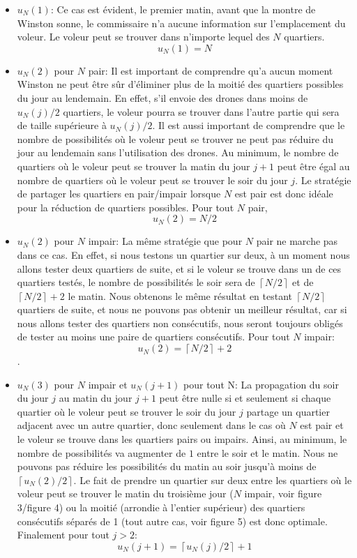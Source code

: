 \begin{itemize}
    \item {$u_N(1)$}: Ce cas est évident, le premier matin, avant que la montre de Winston sonne, le commissaire n'a aucune information sur l'emplacement du voleur. Le voleur peut se trouver dans n'importe lequel des $N$ quartiers.
    $$u_N(1)=N$$
    \item {$u_N(2)$ pour $N$ pair}: Il est important de comprendre qu'a aucun moment Winston ne peut être sûr d'éliminer plus de la moitié des quartiers possibles du jour au lendemain. En effet, s'il envoie des drones dans moins de $u_N(j)/2$ quartiers, le voleur pourra se trouver dans l'autre partie qui sera de taille supérieure à $u_N(j)/2$. Il est aussi important de comprendre que le nombre de possibilités où le voleur peut se trouver ne peut pas réduire du jour au lendemain sans l'utilisation des drones. Au minimum, le nombre de quartiers où le voleur peut se trouver la matin du jour $j+1$ peut être égal au nombre de quartiers où le voleur peut se trouver le soir du jour $j$. Le stratégie de partager les quartiers en pair/impair lorsque $N$ est pair est donc idéale pour la réduction de quartiers possibles. Pour tout $N$ pair, $$u_N(2)=N/2$$
    \item {$u_N(2)$ pour $N$ impair}: La même stratégie que pour $N$ pair ne marche pas dans ce cas. En effet, si nous testons un quartier sur deux, à un moment nous allons tester deux quartiers de suite, et si le voleur se trouve dans un de ces quartiers testés, le nombre de possibilités le soir sera de $\left\lceil N/2\right\rceil$ et de $\left\lceil N/2\right\rceil+2$ le matin. Nous obtenons le même résultat en testant $\left\lceil N/2\right\rceil$ quartiers de suite, et nous ne pouvons pas obtenir un meilleur résultat, car si nous allons tester des quartiers non consécutifs, nous seront toujours obligés de tester au moins une paire de quartiers consécutifs. Pour tout $N$ impair: $$u_N(2)=\left\lceil N/2\right\rceil+2$$.
    \item {$u_N(3)$ pour $N$ impair et $u_N(j+1)$ pour tout N}: La propagation du soir du jour $j$ au matin du jour $j+1$ peut être nulle si et seulement si chaque quartier où le voleur peut se trouver le soir du jour $j$ partage un quartier adjacent avec un autre quartier, donc seulement dans le cas où $N$ est pair et le voleur se trouve dans les quartiers pairs ou impairs. Ainsi, au minimum, le nombre de possibilités va augmenter de $1$ entre le soir et le matin. Nous ne pouvons pas réduire les possibilités du matin au soir jusqu'à moins de $\left\lceil u_N(2)/2 \right\rceil$. Le fait de prendre un quartier sur deux entre les quartiers où le voleur peut se trouver le matin du troisième jour ($N$ impair, voir figure 3/figure 4) ou la moitié (arrondie à l'entier supérieur) des quartiers consécutifs séparés de 1 (tout autre cas, voir figure 5) est donc optimale. Finalement pour tout $j>2$: $$u_N(j+1)=\left\lceil u_N(j)/2 \right\rceil+1$$
    

\end{itemize}
